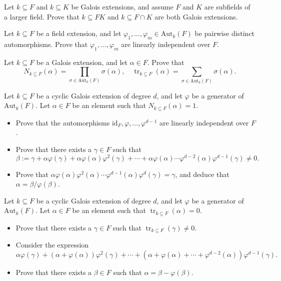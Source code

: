 \documentclass[openany]{book}
\begin{document}
\begin{prop}
Let $k \subseteq F$ and $k \subseteq K$ be Galois extensions, and assume $F$ and $K$ are subfields of a larger field. Prove that $k \subseteq FK$ and $k \subseteq F \cap K$ are both Galois extensions.
\end{prop}

\begin{prob}
Let $k \subseteq F$ be a field extension, and let $\varphi_1, \ldots, \varphi_m \in \text{Aut}_k(F)$ be pairwise distinct automorphisms. Prove that $\varphi_1, \ldots, \varphi_m$ are linearly independent over $F$.
\end{prob}

\begin{prob}
Let $k \subseteq F$ be a Galois extension, and let $\alpha \in F$. Prove that
\[ N_{k \subseteq F}(\alpha) = \prod_{\sigma \in \text{Aut}_k(F)} \sigma(\alpha), \quad \operatorname{tr}_{k \subseteq F}(\alpha) = \sum_{\sigma \in \text{Aut}_k(F)} \sigma(\alpha). \]
\end{prob}

\begin{prob}
Let $k \subseteq F$ be a cyclic Galois extension of degree $d$, and let $\varphi$ be a generator of $\text{Aut}_k(F)$. Let $\alpha \in F$ be an element such that $N_{k \subseteq F}(\alpha) = 1$.
\begin{itemize}
    \item Prove that the automorphisms $\text{id}_F, \varphi, \ldots, \varphi^{d-1}$ are linearly independent over $F$.
    \item Prove that there exists a $\gamma \in F$ such that
    \[ \beta := \gamma + \alpha \varphi(\gamma) + \alpha \varphi(\alpha) \varphi^2(\gamma) + \cdots + \alpha \varphi(\alpha) \cdots \varphi^{d-2}(\alpha) \varphi^{d-1}(\gamma) \neq 0. \]
    \item Prove that $\alpha \varphi(\alpha) \varphi^2(\alpha) \cdots \varphi^{d-1}(\alpha) \varphi^d(\gamma) = \gamma$, and deduce that $\alpha = \beta / \varphi(\beta)$.
\end{itemize}
\end{prob}

\begin{prob}
Let $k \subseteq F$ be a cyclic Galois extension of degree $d$, and let $\varphi$ be a generator of $\text{Aut}_k(F)$. Let $\alpha \in F$ be an element such that $\operatorname{tr}_{k \subseteq F}(\alpha) = 0$.
\begin{itemize}
    \item Prove that there exists a $\gamma \in F$ such that $\operatorname{tr}_{k \subseteq F}(\gamma) \neq 0$.
    \item Consider the expression
    \[ \alpha \varphi(\gamma) + (\alpha + \varphi(\alpha))\varphi^2(\gamma) + \cdots + (\alpha + \varphi(\alpha) + \cdots + \varphi^{d-2}(\alpha))\varphi^{d-1}(\gamma). \]
    \item Prove that there exists a $\beta \in F$ such that $\alpha = \beta - \varphi(\beta)$.
\end{itemize}
\end{prob}
\end{document}
